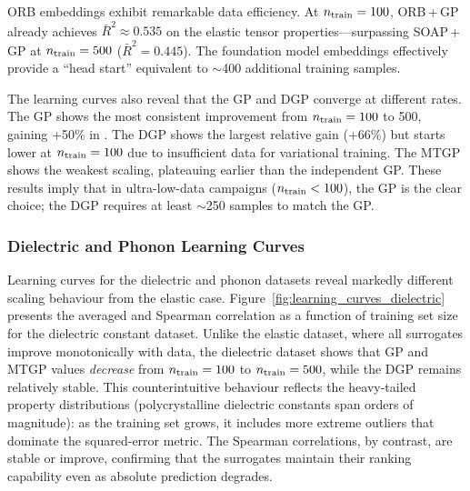 ORB embeddings exhibit remarkable data efficiency.
At $n_{\text{train}} = 100$, ORB\,+\,GP already achieves $\bar{R}^2 \approx 0.535$ on the elastic tensor properties---surpassing SOAP\,+\,GP at $n_{\text{train}} = 500$ ($\bar{R}^2 = 0.445$).
The foundation model embeddings effectively provide a ``head start'' equivalent to $\sim$400 additional training samples.

The learning curves also reveal that the GP and DGP converge at different rates.
The GP shows the most consistent improvement from $n_{\text{train}} = 100$ to 500, gaining +50\% in \Rtwo{}.
The DGP shows the largest relative gain (+66\%) but starts lower at $n_{\text{train}} = 100$ due to insufficient data for variational training.
The MTGP shows the weakest scaling, plateauing earlier than the independent GP.
These results imply that in ultra-low-data campaigns ($n_{\text{train}} < 100$), the GP is the clear choice; the DGP requires at least $\sim$250 samples to match the GP.

\subsubsection{Dielectric and Phonon Learning Curves}
\label{sec:learning_curves_dielectric_phonon}

Learning curves for the dielectric and phonon datasets reveal markedly different scaling behaviour from the elastic case.
Figure~\ref{fig:learning_curves_dielectric} presents the averaged \Rtwo{} and Spearman correlation as a function of training set size for the dielectric constant dataset.
Unlike the elastic dataset, where all surrogates improve monotonically with data, the dielectric dataset shows that GP and MTGP \Rtwo{} values \emph{decrease} from $n_{\text{train}} = 100$ to $n_{\text{train}} = 500$, while the DGP remains relatively stable.
This counterintuitive behaviour reflects the heavy-tailed property distributions (polycrystalline dielectric constants span orders of magnitude): as the training set grows, it includes more extreme outliers that dominate the squared-error metric.
The Spearman correlations, by contrast, are stable or improve, confirming that the surrogates maintain their ranking capability even as absolute prediction degrades.

